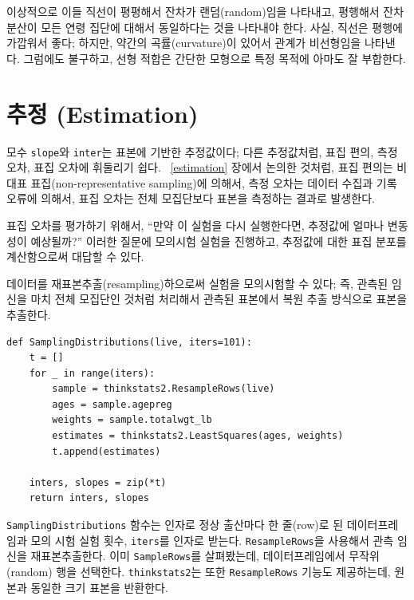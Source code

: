 이상적으로 이들 직선이 평평해서 잔차가 랜덤(random)임을 나타내고, 
평행해서 잔차 분산이 모든 연령 집단에 대해서 동일하다는 것을 나타내야 한다.
사실, 직선은 평행에 가깝워서 좋다; 하지만, 약간의 곡률(curvature)이 있어서 관계가 비선형임을 나타낸다.
그럼에도 불구하고, 선형 적합은 간단한 모형으로 특정 목적에 아마도 잘 부합한다.  



\section{추정 (Estimation)}
\label{regest}

모수 {\tt slope}와 {\tt inter}는 표본에 기반한 추정값이다; 다른 추정값처럼, 표집 편의, 측정 오차, 표집 오차에 휘둘리기 쉽다. 
~\ref{estimation} 장에서 논의한 것처럼, 표집 편의는 비대표 표집(non-representative sampling)에 의해서, 측정 오차는 데이터 수집과 기록 오류에 의해서, 표집 오차는 전체 모집단보다 표본을 측정하는 결과로 발생한다.

표집 오차를 평가하기 위해서, ``만약 이 실험을 다시 실행한다면,
추정값에 얼마나 변동성이 예상될까?''
이러한 질문에 모의시험 실험을 진행하고, 추정값에 대한 표집 분포를 계산함으로써 대답할 수 있다.


데이터를 재표본추출(resampling)하으로써 실험을 모의시험할 수 있다; 즉, 관측된 임신을 마치 전체 모집단인 것처럼 처리해서 관측된 표본에서 복원 추출 방식으로 표본을 추출한다.

\begin{verbatim}
def SamplingDistributions(live, iters=101):
    t = []
    for _ in range(iters):
        sample = thinkstats2.ResampleRows(live)
        ages = sample.agepreg
        weights = sample.totalwgt_lb
        estimates = thinkstats2.LeastSquares(ages, weights)
        t.append(estimates)

    inters, slopes = zip(*t)
    return inters, slopes
\end{verbatim}

{\tt SamplingDistributions} 함수는 인자로 정상 출산마다 한 줄(row)로 된 데이터프레임과 모의 시험 실험 횟수, {\tt iters}를 인자로 받는다. {\tt ResampleRows}을 사용해서 관측 임신을 재표본추출한다. 이미 {\tt SampleRows}를 살펴봤는데, 데이터프레임에서 무작위(random) 행을 선택한다. {\tt thinkstats2}는 또한 {\tt ResampleRows} 기능도 제공하는데, 원본과 동일한 크기 표본을 반환한다.

